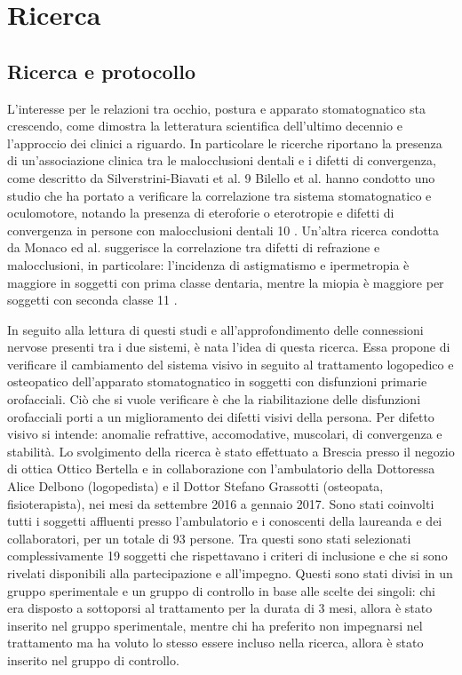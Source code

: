 \chapter{Ricerca}
\section{Ricerca e protocollo}

L’interesse per le relazioni tra occhio, postura e apparato stomatognatico sta crescendo, come dimostra la letteratura
scientifica dell’ultimo decennio e l’approccio dei clinici a riguardo. In particolare le ricerche riportano la presenza di
un’associazione clinica tra le malocclusioni dentali e i difetti di convergenza, come descritto da Silverstrini-Biavati et al. 9
Bilello et al. hanno condotto uno studio che ha portato a verificare la correlazione tra sistema stomatognatico e
oculomotore, notando la presenza di eteroforie o eterotropie e difetti di convergenza in persone con malocclusioni
dentali 10 . Un’altra ricerca condotta da Monaco ed al. suggerisce la correlazione tra difetti di refrazione e malocclusioni,
in particolare: l’incidenza di astigmatismo e ipermetropia è maggiore in soggetti con prima classe dentaria, mentre la
miopia è maggiore per soggetti con seconda classe 11 .

In seguito alla lettura di questi studi e all’approfondimento delle connessioni nervose presenti tra i due sistemi, è nata l’idea di questa ricerca. Essa propone di verificare il cambiamento del sistema visivo in seguito al trattamento logopedico e osteopatico dell’apparato stomatognatico in soggetti con disfunzioni primarie orofacciali. Ciò che si vuole verificare è che la riabilitazione delle disfunzioni orofacciali porti a un miglioramento dei difetti visivi della persona. 
Per difetto visivo si intende: anomalie refrattive, accomodative, muscolari, di convergenza e stabilità. Lo svolgimento della ricerca è stato effettuato a Brescia presso il negozio di ottica Ottico Bertella e in collaborazione con l’ambulatorio della Dottoressa Alice Delbono (logopedista) e il Dottor Stefano Grassotti (osteopata, fisioterapista), nei mesi da settembre 2016 a gennaio 2017. Sono stati coinvolti tutti i soggetti affluenti presso l’ambulatorio e i conoscenti della laureanda e dei collaboratori, per un totale di 93 persone. Tra questi sono stati selezionati complessivamente 19 soggetti che rispettavano i criteri di inclusione e che si sono rivelati disponibili alla partecipazione e all’impegno. Questi sono stati divisi in un gruppo sperimentale e un gruppo di controllo in base alle scelte dei singoli: chi era disposto a sottoporsi al trattamento per la durata di 3 mesi, allora è stato inserito nel gruppo sperimentale, mentre chi ha preferito non impegnarsi nel trattamento ma ha voluto lo stesso essere incluso nella ricerca, allora è stato inserito nel gruppo di controllo.

